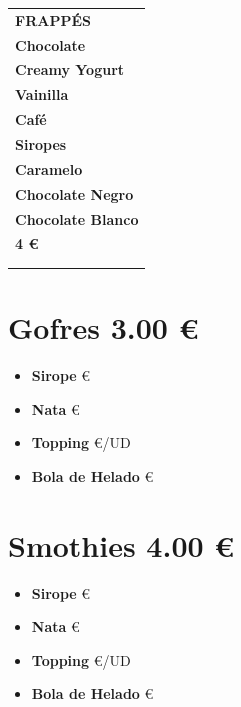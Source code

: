 \documentclass[a4paper,12pt]{article}
\begin{document}
\begin{multicols}{2}
\newcommand{\thickhline}{\noalign{\hrule height 2pt}} %

\begin{tabular}{|>{\centering\arraybackslash}p{6cm}|}
\thickhline
\cellcolor{cellcolor1} \textbf{\large{FRAPPÉS}} \\
\thickhline
\cellcolor{cellcolor2} \rule{0pt}{1cm} \textbf{Chocolate} \\
\cellcolor{cellcolor2} \textbf{Creamy Yogurt} \\
\cellcolor{cellcolor2} \textbf{Vainilla} \\
\cellcolor{cellcolor2} \textbf{Café} \\
\cellcolor{cellcolor2} \rule{0pt}{1.5cm} \textbf{\large{Siropes}} \\
\cellcolor{cellcolor2} \rule{0pt}{1cm} \textbf{Caramelo} \\
\cellcolor{cellcolor2} \textbf{Chocolate Negro} \\
\cellcolor{cellcolor2} \textbf{Chocolate Blanco} \\
\cellcolor{cellcolor2} \rule{0pt}{1cm} \textbf{\large{4 €}} \\
\cellcolor{cellcolor2} \\
\thickhline
\end{tabular}

\columnbreak

\section*{Gofres \hfill 3.00 € } 
\begin{itemize}[label={+}]
\item \textbf{Sirope}  €
\item \textbf{Nata}  €
\item \textbf{Topping}  €/UD
\item \textbf{Bola de Helado}  €
\end{itemize}

\section*{Smothies \hfill 4.00 € }
\begin{itemize}[label={+}]
\item \textbf{Sirope}  €
\item \textbf{Nata}  €
\item \textbf{Topping}  €/UD
\item \textbf{Bola de Helado}  €
\end{itemize}

\end{multicols}
\end{document}
